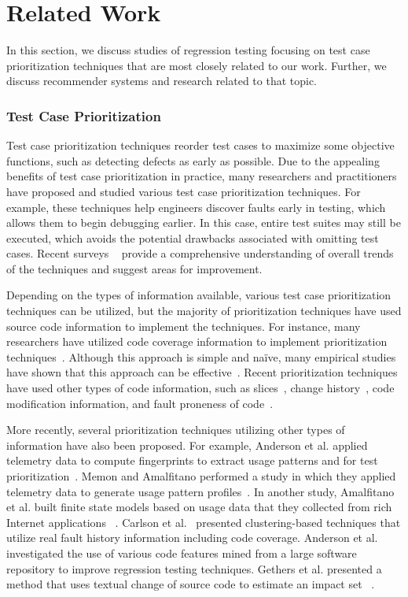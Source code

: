 \section{Related Work}
\label{sec:related-work}

In this section, we discuss studies of  regression testing focusing on 
test case prioritization techniques that are most closely 
related to our work. Further, we discuss recommender systems 
and research related to that topic.

\subsubsection*{Test Case Prioritization}   
Test case prioritization techniques reorder test cases to maximize
some objective functions, such as detecting defects as early as possible.
Due to the appealing benefits of test case prioritization in practice, 
many researchers and practitioners
have proposed and studied various test case prioritization 
techniques. For example, these techniques help engineers discover faults
early in testing, which allows them to begin debugging earlier.
In this case, entire test suites may still be executed, which avoids 
the potential drawbacks associated with omitting test cases. 
Recent surveys ~\cite{catal13, marksurvey} provide a comprehensive 
understanding of overall trends of the techniques and suggest areas for improvement.

Depending on the types of information available, various test case
prioritization techniques can be utilized, but 
the majority of prioritization techniques have used source code
information to implement the techniques.
For instance, many researchers have utilized code coverage information
to implement prioritization techniques~\cite{elbaum02feb, kim02may,rothermel01oct}. Although this approach is simple and naïve, many empirical
studies have shown that this approach can be effective~\cite{cost3, 
cost1, Malishevsky02, myra}.
Recent prioritization techniques have used other
types of code information, such as slices~\cite{jeffrey06sep}, change
history~\cite{sherriff07}, code modification information, and fault
proneness of code~\cite{mirarab07}.

More recently, several prioritization techniques 
utilizing other types of information have also been proposed. 
For example, Anderson et al.  applied telemetry data to compute fingerprints 
to extract usage patterns and for test prioritization~\cite{jeff16}.
Memon and Amalfitano performed a study in which they applied telemetry 
data to generate usage pattern profiles~\cite{memongui}.  
In another study, Amalfitano et al. built finite state models
based on usage data that they collected from rich Internet applications ~\cite{rich}. 
Carlson et al.~\cite{ryan} presented clustering-based techniques that
utilize real fault history information including code coverage.
Anderson et al.~\cite{jeff14} investigated the use of various code features
mined from a large software repository to improve regression testing techniques.
Gethers et al. presented a method  that uses textual change of source code
to estimate an impact set ~\cite{kagdichange}. 

